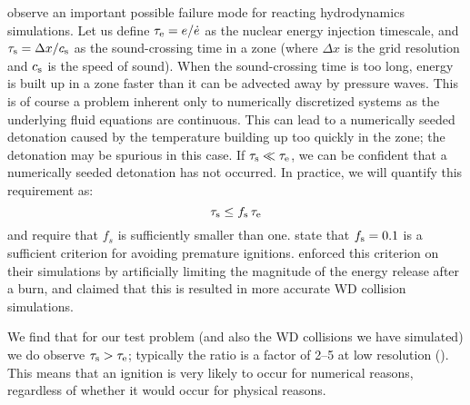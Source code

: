 \documentclass[twocolumn,numberedappendix,trackchanges]{../aastex62}
\begin{document}
\citet{kushnir:2013} observe an important possible failure mode
for reacting hydrodynamics simulations. Let us define $\tau_{\rm e} = e / \dot{e}$
as the nuclear energy injection timescale, and $\tau_{\rm s} = \Delta x / c_{\rm s}$
as the sound-crossing time in a zone (where $\Delta x$ is the grid
resolution and $c_{\rm s}$ is the speed of sound). When the sound-crossing
time is too long, energy is built up in a zone faster than it can be
advected away by pressure waves. 
This is of course a problem inherent 
only to numerically discretized systems as the underlying fluid equations
are continuous. This can lead to a numerically seeded detonation
caused by the temperature building up too quickly in the zone; the
detonation may be spurious in this case. If $\tau_{\rm s} \ll \tau_{\rm e}$,
we can be confident that a numerically seeded detonation has not
occurred. In practice, we will quantify this requirement as:
\begin{equation}
  \tau_{\rm s} \leq f_{\rm s}\, \tau_{\rm e} \label{eq:burning_limiter}
\end{equation}
and require that $f_{s}$ is sufficiently smaller than one.
\citet{kushnir:2013} state that $f_{\rm s} = 0.1$ is a sufficient
criterion for avoiding premature ignitions. \citeauthor{kushnir:2013}
enforced this criterion on their simulations by artificially limiting
the magnitude of the energy release after a burn, and claimed that
this is resulted in more accurate WD collision simulations.

We find that for our test problem (and also the WD collisions we have simulated)
we do observe $\tau_{\rm s} > \tau_{\rm e}$; typically the ratio is a factor of 2--5 at
low resolution (). This means that an ignition is
very likely to occur for numerical reasons, regardless of whether it would occur for physical reasons.
\end{document}
